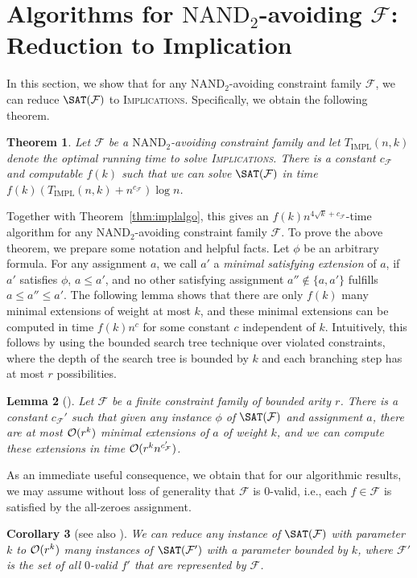 \documentclass[10pt,a4paper]{article}
\theoremstyle{plain}
\newtheorem{thm}{Theorem}[section]
\newtheorem{lem}[thm]{Lemma}
\newtheorem{cor}[thm]{Corollary}
\newcommand{\Oh}{{\cal O}}
\newcommand{\NAND}{\mathrm{NAND}}
\newcommand{\Impl}{\mathrm{IMPL}}
\newcommand{\confam}{\mathcal{F}}
\newcommand{\Implication}{\textsc{Implications}\xspace}
\begin{document}
\section{Algorithms for $\NAND_2$-avoiding $\confam$: Reduction to Implication}
\label{sec:redtoImpl}
%
In this section, we show that for any $\NAND_{2}$-avoiding constraint family $\confam$, we can reduce $\SAT(\confam)$ to \Implication. Specifically, we obtain the following theorem.
\begin{thm}\label{thm:redtoImpl}
Let $\confam$ be a $\NAND_2$-avoiding constraint family and let $T_\Impl(n,k)$ denote the optimal running time to solve \Implication. There is a constant $c_\confam$ and computable $f(k)$ such that we can solve $\SAT(\confam)$ in time 
$f(k)( T_\Impl(n,k) + n^{c_\confam})\log n$.
\end{thm}
%
Together with Theorem~\ref{thm:implalgo}, this gives an $f(k)n^{4\sqrt{k} + c_\confam}$-time algorithm for any $\NAND_2$-avoiding constraint family $\confam$.
%
To prove the above theorem, we prepare some notation and helpful facts. Let $\phi$ be an arbitrary formula.  For any assignment $a$, we call $a'$ a \emph{minimal satisfying extension} of $a$, if $a'$ satisfies $\phi$, $a\le a'$, and no other satisfying assignment $a''\notin \{a,a'\}$ fulfills $a\le a'' \le a'$. The following lemma shows that there are only $f(k)$ many minimal extensions of weight at most $k$, and these minimal extensions can be computed in time $f(k) n^{c}$ for some constant $c$ independent of $k$. Intuitively, this follows by using the bounded search tree technique over violated constraints, where the depth of the search tree is bounded by $k$ and each branching step has at most $r$ possibilities.
%
\begin{lem}[{\cite[Lemma 2.3]{BulatovM14}}]\label{lem:minextensions}
Let $\confam$ be a finite constraint family of bounded arity $r$. There is a constant $c_\confam'$ such that given any instance $\phi$ of $\SAT(\confam)$ and assignment $a$, there are at most $\Oh(r^k)$ minimal extensions of $a$ of weight $k$, and we can compute these extensions in time $\Oh(r^k n^{c'_\confam})$. 
\end{lem}
%
As an immediate useful consequence, we obtain that for our algorithmic results, we may assume without loss of generality that $\confam$ is $0$-valid, i.e., each $f\in \confam$ is satisfied by the all-zeroes assignment.
\begin{cor}[{see also \cite[Lemma 4.1]{Marx05}}]\label{cor:wlog0valid}
We can reduce any instance of $\SAT(\confam)$ with parameter~$k$ to $\Oh(r^k)$ many instances of $\SAT(\confam')$ with a parameter bounded by $k$, where $\confam'$ is the set of all $0$-valid $f'$ that are represented by $\confam$.
\end{cor}
\end{document}
